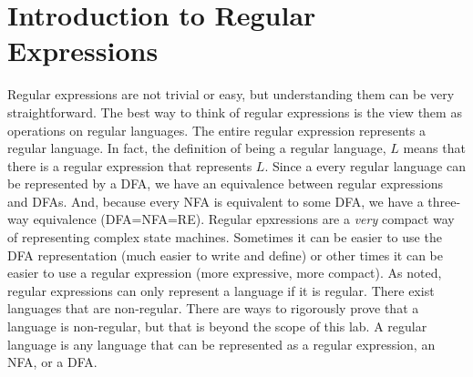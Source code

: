\section*{Introduction to Regular Expressions}
Regular expressions are not trivial or easy, but understanding them can be very straightforward.
The best way to think of regular expressions is the view them as operations on regular languages.  The entire regular expression represents a regular language.  In fact, the definition of being a regular language, $L$ means that there is a regular expression that represents $L$.   Since a every regular language can be represented by a DFA, we have an equivalence between regular expressions and DFAs.  And, because every NFA is equivalent to some DFA, we have a three-way equivalence (DFA=NFA=RE).  Regular epxressions are a \emph{very} compact way of representing complex state machines.  Sometimes it can be easier to use the DFA representation (much easier to write and define) or other times it can be easier to use a regular expression (more expressive, more compact).
As noted, regular expressions can only represent a language if it is regular.  There exist languages that are non-regular.  There are ways to rigorously prove that a language is non-regular, but that is beyond the scope of this lab.  A regular language is any language that can be represented as a regular expression, an NFA, or a DFA.

